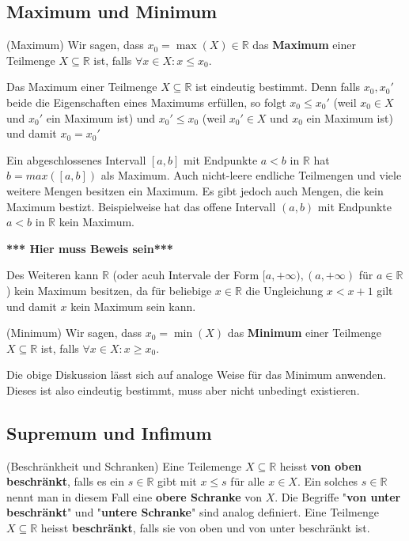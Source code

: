\documentclass[../Analysis1_script.tex]{subfiles}
\begin{document}
 
\subsection{Maximum und Minimum}

\begin{definition}{(Maximum)}
	Wir sagen, dass $x_0 = \max(X) \in \mathbb{R}$ das \textbf{Maximum} einer Teilmenge $X \subseteq \mathbb{R}$ ist, falls $\forall x \in X: x \leq x_0$.
	
	Das Maximum einer Teilmenge $X \subseteq \mathbb{R}$ ist eindeutig bestimmt. Denn falls $x_0, x_0'$ beide die Eigenschaften eines Maximums erfüllen, so folgt $x_0 \leq x_0'$ (weil $x_0 \in X$ und $x_0'$ ein Maximum ist) und $x_0' \leq x_0$ (weil $x_0' \in X$ und $x_0$ ein Maximum ist) und damit $x_0 = x_0'$
	
	Ein abgeschlossenes Intervall $[a, b]$ mit Endpunkte $a < b$ in $\mathbb{R}$ hat $b = max([a, b])$ als Maximum. Auch nicht-leere endliche Teilmengen und viele weitere Mengen besitzen ein Maximum. Es gibt jedoch auch Mengen, die kein Maximum bestizt. Beispielweise hat das offene Intervall $(a, b)$ mit Endpunkte $a < b$ in $\mathbb{R}$ kein Maximum.
	
	\textbf{*** Hier muss Beweis sein***}
	
	Des Weiteren kann $\mathbb{R}$ (oder acuh  Intervale der Form $[a, +\infty), (a, +\infty)$ für $a \in \mathbb{R}$) kein Maximum besitzen, da für beliebige $x \in \mathbb{R}$ die Ungleichung $x < x + 1$ gilt und damit $x$ kein Maximum sein kann. 
\end{definition}

\begin{definition}{(Minimum)}
	Wir sagen, dass $x_0 = \min(X)$ das \textbf{Minimum} einer Teilmenge $X \subseteq \mathbb{R}$ ist, falls $\forall x \in X: x \geq x_0$.
	
	Die obige Diskussion lässt sich auf analoge Weise für das Minimum anwenden. Dieses ist also eindeutig bestimmt, muss aber nicht unbedingt existieren.
\end{definition}


\subsection{Supremum und Infimum}

\begin{definition}{(Beschränkheit und Schranken)}
	Eine Teilemenge $X \subseteq \mathbb{R}$ heisst \textbf{von oben beschränkt}, falls es ein $s \in \mathbb{R}$ gibt mit $x \leq s$ für alle $x \in X$. Ein solches $s \in \mathbb{R}$ nennt man in diesem Fall eine \textbf{obere Schranke} von $X$. Die Begriffe "\textbf{von unter beschränkt}" und "\textbf{untere Schranke}" sind analog definiert. Eine Teilmenge $X \subseteq \mathbb{R}$ heisst \textbf{beschränkt}, falls sie von oben und von unter beschränkt ist.
\end{definition}
\end{document}
